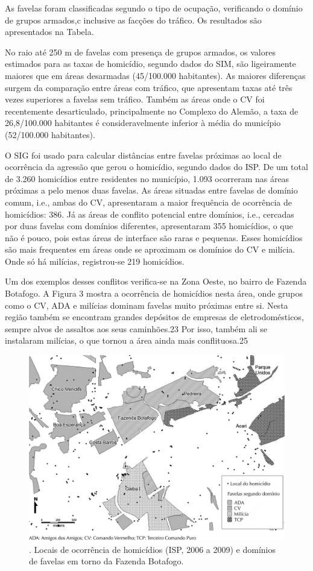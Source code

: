 \documentclass{article}
\begin{document}
As favelas foram classificadas segundo o tipo de ocupação, verificando o domínio
de grupos armados,c inclusive as facções do tráfico. Os resultados são
apresentados na Tabela.

No raio até 250 m de favelas com presença de grupos armados, os valores
estimados para as taxas de homicídio, segundo dados do SIM, são ligeiramente
maiores que em áreas desarmadas (45/100.000 habitantes). As maiores diferenças
surgem da comparação entre áreas com tráfico, que apresentam taxas até três
vezes superiores a favelas sem tráfico. Também as áreas onde o CV foi
recentemente desarticulado, principalmente no Complexo do Alemão, a taxa de
26,8/100.000 habitantes é consideravelmente inferior à média do município
(52/100.000 habitantes).

O SIG foi usado para calcular distâncias entre favelas próximas ao local de
ocorrência da agressão que gerou o homicídio, segundo dados do ISP. De um total
de 3.260 homicídios entre residentes no município, 1.093 ocorreram nas áreas
próximas a pelo menos duas favelas. As áreas situadas entre favelas de domínio
comum, i.e., ambas do CV, apresentaram a maior frequência de ocorrência de
homicídios: 386. Já as áreas de conflito potencial entre domínios, i.e.,
cercadas por duas favelas com domínios diferentes, apresentaram 355 homicídios,
o que não é pouco, pois estas áreas de interface são raras e pequenas. Esses
homicídios são mais frequentes em áreas onde se aproximam os domínios do CV e
milícia. Onde só há milícias, registrou-se 219 homicídios.

Um dos exemplos desses conflitos verifica-se na Zona Oeste, no bairro de Fazenda
Botafogo. A Figura 3 mostra a ocorrência de homicídios nesta área, onde grupos
como o CV, ADA e milícias dominam favelas muito próximas entre si. Nesta região
também se encontram grandes depósitos de empresas de eletrodomésticos, sempre
alvos de assaltos aos seus caminhões.23 Por isso, também ali se instalaram
milícias, o que tornou a área ainda mais conflituosa.25

\begin{figure}
\includegraphics[width=\textwidth]{0034-8910-rsp-48-01-0094-gf03}
\caption{. Locais de ocorrência de homicídios (ISP, 2006 a 2009) e domínios de
favelas em torno da Fazenda Botafogo.}
\end{figure}
\end{document}
